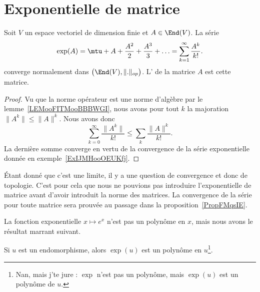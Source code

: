 \section{Exponentielle de matrice}
\label{secAOnIwQM}

\begin{proposition}     \label{PropPEDSooAvSXmY}
    Soit \( V\) un espace vectoriel de dimension finie et \( A\in\End(V)\). La série
    \begin{equation}
        \exp(A)=\mtu+A+\frac{ A^2 }{ 2 }+\frac{ A^3 }{ 3 }+\ldots =\sum_{k=1}^{\infty}\frac{ A^k }{ k! }.
    \end{equation}
    converge normalement dans \( \big( \End(V),\| . \|_{op} \big)\).  L' de la matrice \( A\) est cette matrice.
\end{proposition}

\begin{proof}
    Vu que la norme opérateur est une norme d'algèbre par le lemme~\ref{LEMooFITMooBBBWGI}, nous avons pour tout \( k\) la majoration \( \| A^k \|\leq \| A \|^k\). Nous avons donc
    \begin{equation}
        \sum_{k=0}^{\infty}\frac{ \| A^k \| }{ k! }\leq \sum_k\frac{ \| A \|^k }{ k! }.
    \end{equation}
    La dernière somme converge en vertu de la convergence de la série exponentielle donnée en exemple~\ref{ExIJMHooOEUKfj}.
\end{proof}

Étant donné que c'est une limite, il y a une question de convergence et donc de topologie. C'est pour cela que nous ne pouvions pas introduire l'exponentielle de matrice avant d'avoir introduit la norme des matrices. La convergence de la série pour toute matrice sera prouvée au passage dans la proposition~\ref{PropFMqsIE}.


La fonction exponentielle \(  x\mapsto e^{x}\) n'est pas un polynôme en \( x\), mais nous avons le résultat marrant suivant.
\begin{proposition} \label{PropFMqsIE}
    Si \( u\) est un endomorphisme, alors \( \exp(u)\) est un polynôme en \( u\)\footnote{Nan, mais j'te jure : \( \exp\) n'est pas un polynôme, mais $\exp(u)$ est un polynôme de \( u\).}.
\end{proposition}

